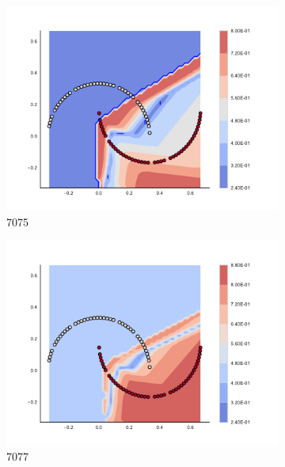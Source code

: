 \begin{figure}[h]
\begin{subfigure}[b]{0.09\textwidth}
    \includegraphics[clip, trim=2.35cm 1.75cm 4.5cm 0cm,width=\textwidth]{img/convergence/7075.pdf}
    \caption{7075}
    \label{fig:convergence_7075}
\end{subfigure}
%
\begin{subfigure}[b]{0.09\textwidth}
    \includegraphics[clip, trim=2.35cm 1.75cm 4.5cm 0cm,width=\textwidth]{img/convergence/7077.pdf}
    \caption{7077}
    \label{fig:convergence_7077}
\end{subfigure}
%
\begin{subfigure}[b]{0.09\textwidth}

\end{subfigure}
\end{figure}
